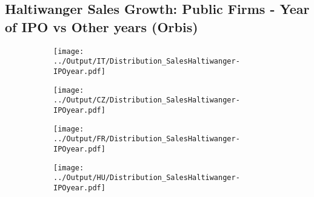 \documentclass[12pt,notitlepage]{article}
\begin{document}
\begin{table}[!htpb]
    \centering
    \caption{France}
    \label{tab:my_label}
\end{table}

\begin{table}[!htpb]
    \centering
    \caption{Hungary}
    \label{tab:my_label}
\end{table}

\begin{table}[!htpb]
    \centering
    \caption{Czech Republic}
    \label{tab:my_label}
\end{table}
\pagebreak



\subsection{Haltiwanger Sales Growth: Public Firms - Year of IPO vs Other years (Orbis)}
\begin{figure}[!htpb]
\centering
\begin{subfigure}{.49\textwidth}
    \centering
 \texttt{[image: ../Output/IT/Distribution\_SalesHaltiwanger-IPOyear.pdf]}
\end{subfigure}%
\begin{subfigure}{.49\textwidth}
    \centering
 \texttt{[image: ../Output/CZ/Distribution\_SalesHaltiwanger-IPOyear.pdf]}
\end{subfigure}
\begin{subfigure}{.49\textwidth}
    \centering
 \texttt{[image: ../Output/FR/Distribution\_SalesHaltiwanger-IPOyear.pdf]}
\end{subfigure}%
\begin{subfigure}{.49\textwidth}
    \centering
 \texttt{[image: ../Output/HU/Distribution\_SalesHaltiwanger-IPOyear.pdf]}
\end{subfigure}
\end{figure}
\pagebreak
\end{document}
